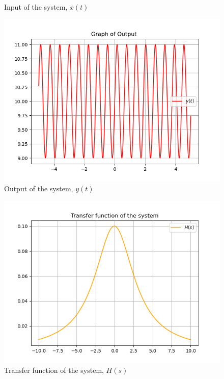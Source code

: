\documentclass[journal,12pt,twocolumn]{IEEEtran}
\theoremstyle{remark}
\begin{document}
\begin{enumerate}
\begin{figure}[h]
    \caption{Input of the system, $x(t)$} 
\end{figure}
\begin{figure}[h]
    \centering
    \includegraphics[width=\columnwidth]{2022/EE/37/figs/output.png}
    \caption{Output of the system, $y(t)$} 
\end{figure}
\begin{figure}[h]
    \centering
    \includegraphics[width=\columnwidth]{2022/EE/37/figs/transfer.png}
    \caption{Transfer function of the system, $H(s)$} 
\end{figure}

\end{enumerate}
\end{document}
